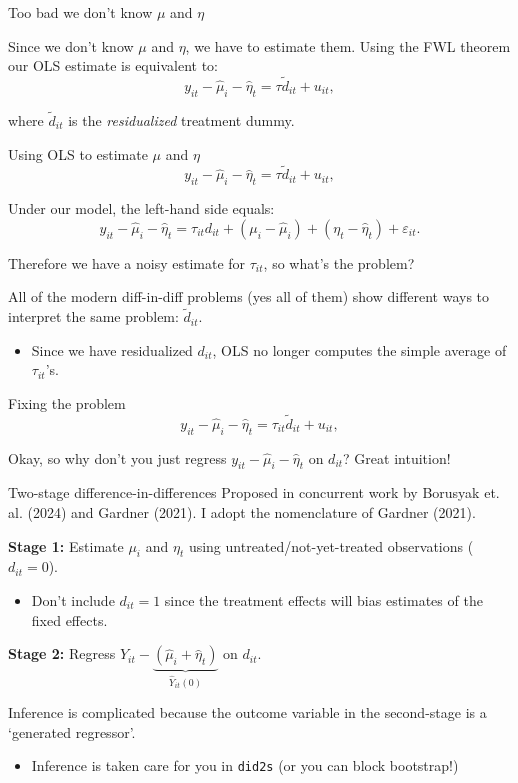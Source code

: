 \documentclass[t]{beamer}
\begin{document}
\begin{frame}{Too bad we don't know $\mu$ and $\eta$}

  Since we don't know $\mu$ and $\eta$, we have to estimate them. Using the FWL theorem our OLS estimate is equivalent to: 
  $$
    y_{it} - \hat{\mu}_i - \hat{\eta}_t = \tau \tilde{d}_{it} + u_{it},
  $$

  where $\tilde{d}_{it}$ is the \emph{residualized} treatment dummy.
\end{frame}

\begin{frame}{Using OLS to estimate $\mu$ and $\eta$}
  $$
    y_{it} - \hat{\mu}_i - \hat{\eta}_t = \tau \tilde{d}_{it} + u_{it},
  $$
  
  \bigskip
  Under our model, the left-hand side equals:
  $$
    y_{it} - \hat{\mu}_i - \hat{\eta}_t = \tau_{it} d_{it} + (\mu_i - \hat{\mu}_i) + (\eta_t - \hat{\eta}_t) + \varepsilon_{it}.
  $$
  
  Therefore we have a noisy estimate for $\tau_{it}$, so what's the problem? 

  \bigskip
  \pause
  All of the modern diff-in-diff problems (yes all of them) show different ways to interpret the same problem: $\tilde{d}_{it}$.
  \begin{itemize}
    \item Since we have residualized $d_{it}$, OLS no longer computes the simple average of $\tau_{it}$'s.
  \end{itemize}
\end{frame}

\begin{frame}{Fixing the problem}
  $$
  y_{it} - \hat{\mu}_i - \hat{\eta}_t = \tau_{it} \tilde{d}_{it} + u_{it},
  $$

  \bigskip
  Okay, so why don't you just regress $y_{it} - \hat{\mu}_i - \hat{\eta}_t$ on $d_{it}$? Great intuition!
\end{frame}

\begin{frame}{Two-stage difference-in-differences}
  Proposed in concurrent work by Borusyak et. al. (2024) and Gardner (2021). I adopt the nomenclature of Gardner (2021).

  \bigskip
  \textbf{Stage 1:}
  Estimate $\mu_i$ and $\eta_t$ using untreated/not-yet-treated observations ($d_{it} = 0$). 
  \begin{itemize}
    \item Don't include $d_{it} = 1$ since the treatment effects will bias estimates of the fixed effects.
  \end{itemize}

  \bigskip
  \textbf{Stage 2:}
  Regress $Y_{it} - \underbrace{\left( \hat{\mu}_i + \hat{\eta}_t \right)}_{\hat{Y}_{it}(0)}$ on $d_{it}$.

  \pause
  \bigskip
  Inference is complicated because the outcome variable in the second-stage is a `generated regressor'. 
  \begin{itemize}
    \item Inference is taken care for you in \texttt{did2s} (or you can block bootstrap!)
  \end{itemize}
\end{frame}
\end{document}
